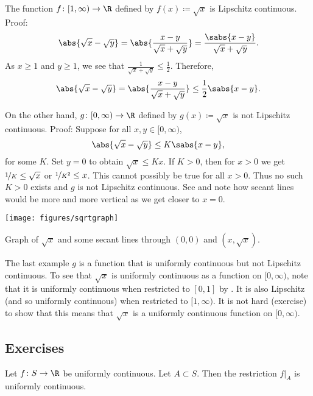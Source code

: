 \begin{example}
The function $f \colon [1,\infty) \to \R$ defined by $f(x) \coloneqq \sqrt{x}$
is Lipschitz continuous. Proof:
\begin{equation*}
\abs{\sqrt{x}-\sqrt{y}} = 
\abs{\frac{x-y}{\sqrt{x}+\sqrt{y}}}
=
\frac{\sabs{x-y}}{\sqrt{x}+\sqrt{y}} .
\end{equation*}
As $x \geq 1$ and $y \geq 1$, we see that $\frac{1}{\sqrt{x}+\sqrt{y}}
\leq \frac{1}{2}$.  Therefore,
\begin{equation*}
\abs{\sqrt{x}-\sqrt{y}} = 
\abs{\frac{x-y}{\sqrt{x}+\sqrt{y}}}
\leq
\frac{1}{2}
\sabs{x-y}.
\end{equation*}

On the other hand, $g \colon [0,\infty) \to \R$ defined by
$g(x) \coloneqq \sqrt{x}$ is not Lipschitz continuous.  Proof:
Suppose for all $x,y \in [0,\infty)$,
\begin{equation*}
\abs{\sqrt{x}-\sqrt{y}} 
\leq
K \sabs{x-y} ,
\end{equation*}
for some $K$.  Set $y=0$ to obtain
$\sqrt{x} \leq K x$.   If $K > 0$, then for $x > 0$ we get
$\nicefrac{1}{K} \leq \sqrt{x}$ or $\nicefrac{1}{K^2} \leq x$.
This cannot possibly be true for all
$x > 0$.  Thus no such $K > 0$ exists and $g$ is not
Lipschitz continuous.  See  and note how secant
lines would be more and more vertical as we get closer to $x=0$.
\begin{myfigureht}
\texttt{[image: figures/sqrtgraph]}
\caption{Graph of $\sqrt{x}$ and some secant lines through $(0,0)$ and
$(x,\sqrt{x})$.\label{fig:sqrtgraph}}
\end{myfigureht}

The last example $g$ is a function that is uniformly
continuous but not Lipschitz continuous.
To see that $\sqrt{x}$ is
uniformly continuous as a function on $[0,\infty)$,
note that it is uniformly continuous when restricted to $[0,1]$ by .
It is also Lipschitz (and so uniformly continuous) when restricted to $[1,\infty)$.
It is not hard (exercise) to show that this means that $\sqrt{x}$ is a
uniformly continuous function on $[0,\infty)$.
\end{example}

\subsection{Exercises}

\begin{exercise}
Let $f \colon S \to \R$ be uniformly continuous.  Let $A \subset S$.
Then the restriction $f|_A$ is uniformly continuous.
\end{exercise}

